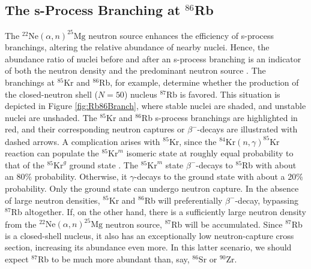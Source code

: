 \subsection{The s-Process Branching at $^{86}$Rb} \label{subsec:86Rb_Branch}

The $^{22}\mathrm{Ne}(\alpha,n)^{25}\mathrm{Mg}$ neutron source enhances the efficiency of s-process branchings, altering the relative abundance of nearby nuclei. Hence, the abundance ratio of nuclei before and after an s-process branching is an indicator of both the neutron density and the predominant neutron source \cite{Garcia2006}. The branchings at $^{85}$Kr and $^{86}$Rb, for example, determine whether the production of the closed-neutron shell ($N=50$) nucleus $^{87}$Rb is favored. This situation is depicted in Figure \ref{fig:Rb86Branch}, where stable nuclei are shaded, and unstable nuclei are unshaded. The $^{85}$Kr and $^{86}$Rb s-process branchings are highlighted in red, and their corresponding neutron captures or $\beta^{-}$-decays are illustrated with dashed arrows. A complication arises with $^{85}$Kr, since the $^{84}\mathrm{Kr}(n,\gamma)^{85}\mathrm{Kr}$ reaction can populate the $^{85}\mathrm{Kr}^{m}$ isomeric state at roughly equal probability to that of the $^{85}\mathrm{Kr}^{g}$ ground state \cite{Raut2013}. The $^{85}\mathrm{Kr}^{m}$ state $\beta^{-}$-decays to $^{85}$Rb with about an $80\%$ probability. Otherwise, it $\gamma$-decays to the ground state with about a $20\%$ probability. Only the ground state can undergo neutron capture. In the absence of large neutron densities, $^{85}$Kr and $^{86}$Rb will preferentially $\beta^{-}$-decay, bypassing $^{87}$Rb altogether. If, on the other hand, there is a sufficiently large neutron density from the $^{22}\mathrm{Ne}(\alpha,n)^{25}\mathrm{Mg}$ neutron source, $^{87}$Rb will be accumulated. Since $^{87}$Rb is a closed-shell nucleus, it also has an exceptionally low neutron-capture cross section, increasing its abundance even more. In this latter scenario, we should expect $^{87}$Rb to be much more abundant than, say, $^{86}$Sr or $^{90}$Zr.

\newpage

\def\BoxSpace{0.3} %
\def\BoxSpacetwo{\BoxSpace * 2} %
\def\BoxSpacethree{\BoxSpace * 3}
\def\BoxSpacefour{\BoxSpace * 4}
\def\BoxSpacehalf{\BoxSpace * 0.5}
\def\AOS{0.1} %
\def\AW{0.52} %

